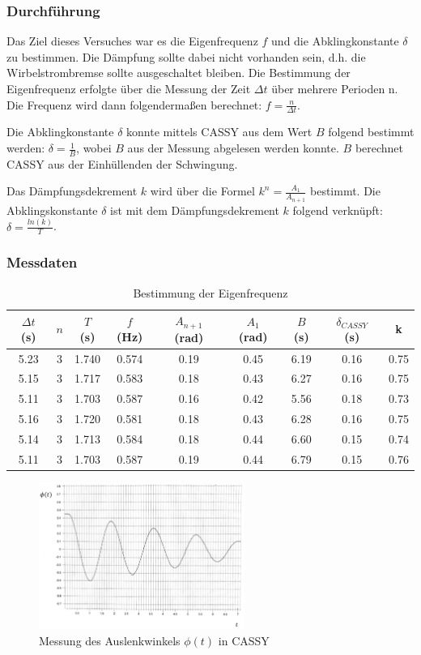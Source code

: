 \documentclass{article}
\begin{document}
\subsubsection{Durchführung}
Das Ziel dieses Versuches war es die Eigenfrequenz $f$ und die Abklingkonstante $\delta$ zu
bestimmen. Die Dämpfung sollte dabei nicht vorhanden sein, d.h. die Wirbelstrombremse
sollte ausgeschaltet bleiben. Die Bestimmung der Eigenfrequenz erfolgte über
die Messung der Zeit $\Delta t$ über mehrere Perioden n. Die Frequenz wird dann
folgendermaßen berechnet: $f = \frac{n}{\Delta t}$.

Die Abklingkonstante $\delta$ konnte mittels CASSY aus dem Wert $B$ folgend
bestimmt werden: $\delta = \frac{1}{B}$, wobei $B$ aus der Messung abgelesen werden konnte. $B$ berechnet CASSY aus der
Einhüllenden der Schwingung.

Das Dämpfungsdekrement $k$ wird über die Formel $k^n = \frac{A_1}{A_{n+1}}$ bestimmt. Die Abklingskonstante $\delta$ ist
mit dem Dämpfungsdekrement $k$ folgend verknüpft: $\delta = \frac{ln(k)}{T}$.
\subsubsection{Messdaten}
\begin{table}[H]
    \centering
    \begin{tabular}{|c|c|c|c|c|c|c|c|c|}
    \hline
    $\Delta t$ (s) & $n$ & $T$ (s) & $f$ (Hz) & $A_{n+1}$ (rad) & $A_1$ (rad) & $B$ (s) & $\delta_{CASSY}$ (s) & k\\
    \hline
    5.23 & 3 & 1.740 & 0.574 & 0.19 & 0.45 & 6.19 & 0.16 & 0.75 \\
    5.15 & 3 & 1.717 & 0.583 & 0.18 & 0.43 & 6.27 & 0.16 & 0.75 \\
    5.11 & 3 & 1.703 & 0.587 & 0.16 & 0.42 & 5.56 & 0.18 & 0.73 \\
    5.16 & 3 & 1.720 & 0.581 & 0.18 & 0.43 & 6.28 & 0.16 & 0.75 \\
    5.14 & 3 & 1.713 & 0.584 & 0.18 & 0.44 & 6.60 & 0.15 & 0.74 \\
    5.11 & 3 & 1.703 & 0.587 & 0.19 & 0.44 & 6.79 & 0.15 & 0.76 \\
    \hline
    \end{tabular}
    \caption{Bestimmung der Eigenfrequenz}
    \label{tab:eigenfrequenz}
\end{table}

\begin{figure}[H]
    \centering
    \includegraphics[width=0.6\textwidth]{bilder/eigenfreq_messdaten.png}
    \caption{Messung des Auslenkwinkels $\phi(t)$ in CASSY}
    \label{fig:eigenfreq_messdaten}
\end{figure}
\end{document}
